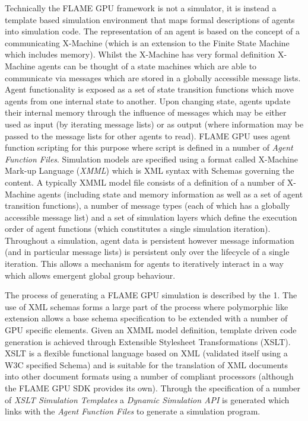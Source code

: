 \documentclass[11pt, a4paper, onecolumn, oneside]{report}
\begin{document}
Technically the FLAME GPU framework is not a simulator, it is instead a template based simulation environment that maps formal descriptions of agents into simulation code.
The representation of an agent is based on the concept of a communicating X-Machine (which is an extension to the Finite State Machine which includes memory).
Whilst the X-Machine has very formal definition X-Machine agents can be thought of a state machines which are able to communicate via messages which are stored in a globally accessible message lists.
Agent functionality is exposed as a set of state transition functions which move agents from one internal state to another.
Upon changing state, agents update their internal memory through the influence of messages which may be either used as input (by iterating message lists) or as output (where information may be passed to the message lists for other agents to read).
FLAME GPU uses agent function scripting for this purpose where script is defined in a number of \emph{Agent Function Files}.
Simulation models are specified using a format called X-Machine Mark-up Language (\emph{XMML}) which is XML syntax with Schemas governing the content.
A typically XMML model file consists of a definition of a number of X-Machine agents (including state and memory information as well as a set of agent transition functions), a number of message types (each of which has a globally accessible message list) and a set of simulation layers which define the execution order of agent functions (which constitutes a single simulation iteration).
Throughout a simulation, agent data is persistent however message information (and in particular message lists) is persistent only over the lifecycle of a single iteration.
This allows a mechanism for agents to iteratively interact in a way which allows emergent global group behaviour.

The process of generating a FLAME GPU simulation is described by the 1.
The use of XML schemas forms a large part of the process where polymorphic like extension allows a base schema specification to be extended with a number of GPU specific elements.
Given an XMML model definition, template driven code generation is achieved through Extensible Stylesheet Transformations (XSLT).
XSLT is a flexible functional language based on XML (validated itself using a W3C specified Schema) and is suitable for the translation of XML documents into other document formats using a number of compliant processors (although the FLAME GPU SDK provides its own).
Through the specification of a number of \emph{XSLT Simulation Templates} a \emph{Dynamic Simulation API} is generated which links with the \emph{Agent Function Files} to generate a simulation program.
\end{document}
